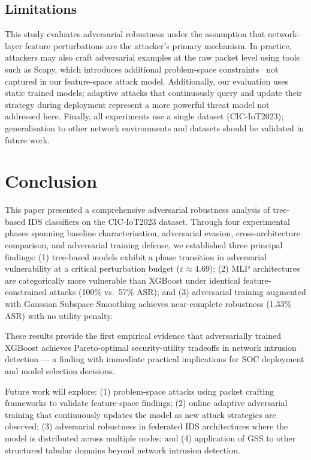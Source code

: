 \documentclass[review,12pt]{elsarticle}
\begin{document}
\subsection{Limitations}

This study evaluates adversarial robustness under the assumption that network-layer feature perturbations are the attacker's primary mechanism. In practice, attackers may also craft adversarial examples at the raw packet level using tools such as Scapy, which introduces additional problem-space constraints~\cite{sheatsley2022space} not captured in our feature-space attack model. Additionally, our evaluation uses static trained models; adaptive attacks that continuously query and update their strategy during deployment represent a more powerful threat model not addressed here. Finally, all experiments use a single dataset (CIC-IoT2023); generalisation to other network environments and datasets should be validated in future work.

\section{Conclusion}
\label{sec:conclusion}

This paper presented a comprehensive adversarial robustness analysis of tree-based IDS classifiers on the CIC-IoT2023 dataset. Through four experimental phases spanning baseline characterisation, adversarial evasion, cross-architecture comparison, and adversarial training defense, we established three principal findings: (1) tree-based models exhibit a phase transition in adversarial vulnerability at a critical perturbation budget ($\varepsilon \approx 4.69$); (2) MLP architectures are categorically more vulnerable than XGBoost under identical feature-constrained attacks (100\% vs.\ 57\% ASR); and (3) adversarial training augmented with Gaussian Subspace Smoothing achieves near-complete robustness (1.33\% ASR) with no utility penalty.

These results provide the first empirical evidence that adversarially trained XGBoost achieves Pareto-optimal security-utility tradeoffs in network intrusion detection --- a finding with immediate practical implications for SOC deployment and model selection decisions.

Future work will explore: (1) problem-space attacks using packet crafting frameworks to validate feature-space findings; (2) online adaptive adversarial training that continuously updates the model as new attack strategies are observed; (3) adversarial robustness in federated IDS architectures where the model is distributed across multiple nodes; and (4) application of GSS to other structured tabular domains beyond network intrusion detection.
\end{document}
